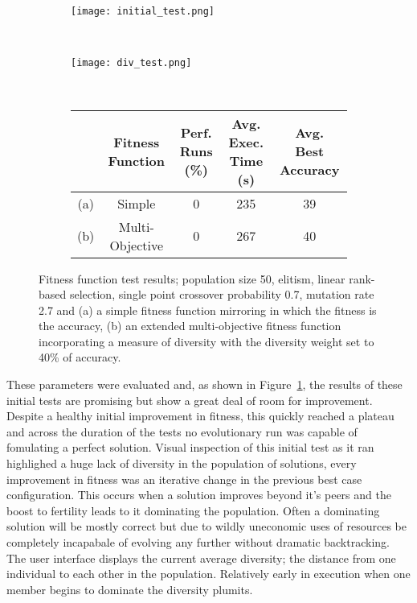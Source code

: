 \begin{figure}
	\centering
	\begin{subfigure}[ht]{0.49\textwidth}
		\texttt{[image: initial\_test.png]}
		\caption{}
		\label{fig:initial}
		\vspace{1em}
	\end{subfigure}
	~
	\begin{subfigure}[ht]{0.49\textwidth}
		\texttt{[image: div\_test.png]}
		\caption{}
		\label{fig:initial_div}
		\vspace{1em}
	\end{subfigure}
	~
	\begin{subfigure}[ht]{\textwidth}
		\centering
		\begin{tabular}{ccccc}
			\toprule
			& \bfseries{Fitness Function} &
			\bfseries{Perf. Runs (\%)} &
			\bfseries{Avg. Exec. Time (s)} & \bfseries{Avg. Best Accuracy}\\
			\midrule
			(a) & Simple & 0 & 235 & 39\\
			(b) & Multi-Objective & 0 & 267 & 40\\
			\bottomrule
		\end{tabular}
	\end{subfigure}

	\caption[Fitness function test results]{Fitness function test results;
		population size 50, elitism, linear rank-based selection, single point
		crossover probability 0.7, mutation rate 2.7 and
		(a) a simple fitness function mirroring \cite{10.1007/3-540-63173-9_61} in
		which the fitness is the accuracy,
		(b) an extended multi-objective fitness function incorporating a measure
		of diversity with the diversity weight set to 40\% of accuracy.}
\end{figure}

These parameters were evaluated and, as shown in Figure~\ref{fig:initial},
the results of these initial tests are
promising but show a great deal of room for improvement. Despite a healthy
initial improvement in fitness, this quickly reached a plateau and
across the duration of the tests no evolutionary run was
capable of fomulating a perfect solution.
Visual inspection of this initial test as it ran highlighed a huge lack of
diversity in the population of solutions, every improvement in fitness was
an iterative change in the previous best case configuration. This occurs
when a solution improves beyond it's peers and the boost to fertility leads to
it dominating the population. Often a dominating solution will be mostly
correct but due to wildly uneconomic uses of resources be completely incapabale
of evolving any further without dramatic backtracking. The user interface displays
the current average diversity; the distance from one individual to each other in the
population. Relatively early in execution when one member begins to dominate the
diversity plumits.

